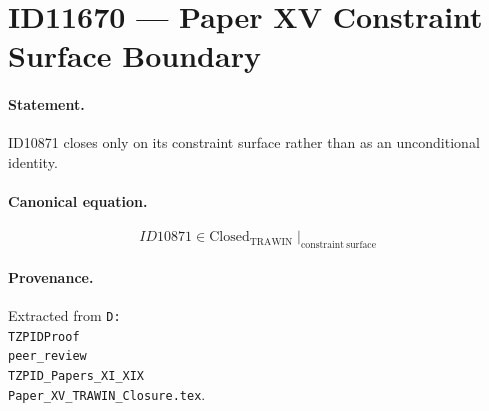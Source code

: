 \section*{ID11670 --- Paper XV Constraint Surface Boundary}

\paragraph{Statement.}
ID10871 closes only on its constraint surface rather than as an unconditional identity.

\paragraph{Canonical equation.}
\[
ID10871\in\mathrm{Closed}_{\mathrm{TRAWIN}}\mid_{\mathrm{constraint\ surface}}
\]

\paragraph{Provenance.}
Extracted from \texttt{D:\\TZPIDProof\\peer\_review\\TZPID\_Papers\_XI\_XIX\\Paper\_XV\_TRAWIN\_Closure.tex}.
